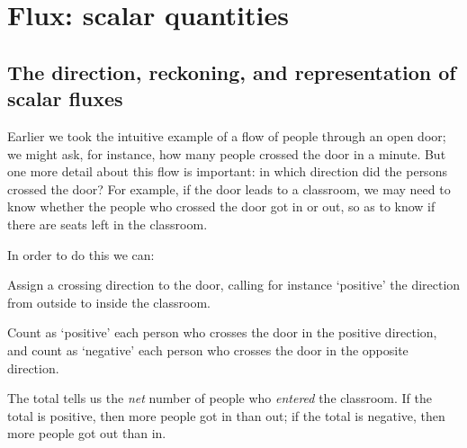 \documentclass[a4paper,12pt,%
onecolumn,oneside,titlepage,%
british%
]{memoir}
\renewcommand*{\|}[1][]{\nonscript\:#1\vert\nonscript\:\mathopen{}}
\begin{document}
\section{Flux: scalar quantities}
\label{sec:intuition_fluxes_scalar}

\subsection{The direction, reckoning, and representation of scalar fluxes}
\label{sec:flux_scalar_direction}

Earlier we took the intuitive example of a flow of people through an open door; we might ask, for instance, how many people crossed the door in a minute. But one more detail about this flow is important: in which direction did the persons crossed the door? For example, if the door leads to a classroom, we may need to know whether the people who crossed the door got in or out, so as to know if there are seats left in the classroom.

In order to do this we can:
\begin{enumerate*}[label=\arabic*.]
\item Assign a crossing direction to the door, calling for instance \enquote*{positive} the direction from outside to inside the classroom.
\item Count as \enquote*{positive} each person who crosses the door in the positive direction, and count as \enquote*{negative} each person who crosses the door in the opposite direction.
\end{enumerate*}
The total tells us the \emph{net} number of people who \emph{entered} the classroom.
If the total is positive, then more people got in than out; if the total is negative, then more people got out than in.
\end{document}
